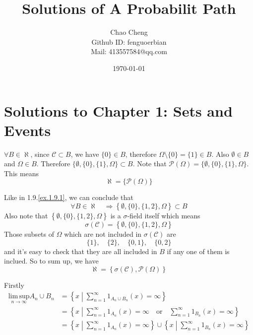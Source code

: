 \documentclass[a4paper,12pt]{article}
\title{Solutions of A Probabilit Path}
\author{Chao Cheng
  \\
  Github ID: fenguoerbian
  \\
  Mail: 413557584@qq.com}
\date{\today}
\begin{document}
\maketitle

\section{Solutions to Chapter 1: Sets and Events}
\label{sec:solutions-chapter-1}

\setcounter{Lcount}{0}
\begin{list}{1.9.}{}
\item \label{ex.1.9.1}
  $\forall B \in \aleph$, since $\mathcal{C}\subset B$, we have $\{0\}\in B$, therefore $\Omega\setminus \{0\}=\{1\}\in B$. Also $\emptyset\in B$ and $\Omega\in B$. Therefore $\{\emptyset,\{0\}, \{1\}, \Omega\}\subset B$. Note that $\mathcal{P}\left(\Omega\right) = \{\emptyset,\{0\}, \{1\}, \Omega\}$. This means
  \[
    \aleph = \{\mathcal{P}\left(\Omega\right)\}
  \]
\item \label{ex.1.9.2}Like in 1.9.\ref{ex.1.9.1}, we can conclude that
  \[
    \forall B \in \aleph \quad \Rightarrow \left\{\emptyset, \{0\}, \{1,2\}, \Omega\right\} \subset B
  \]
  Also note that $\left\{\emptyset, \{0\}, \{1,2\}, \Omega\right\}$ is a $\sigma$-field itself which means
  \[
    \sigma\left(\mathcal{C}\right) = \left\{\emptyset, \{0\}, \{1,2\}, \Omega\right\}
  \]
  Those subsets of $\Omega$ which are not included in $\sigma(\mathcal{C})$ are
  \[
    \{1\},\quad \{2\},\quad \{0,1\},\quad \{0,2\}
  \]
  and it's easy to check that they are all included in $B$ if any one of them is inclued. So to sum up, we have
  \[
    \aleph = \left\{\sigma(\mathcal{C}), \mathcal{P}\left(\Omega\right)\right\}
  \]
\item \label{ex.1.9.3} Firstly
  \[
    \begin{aligned}
      \underset{n\to\infty}{\mathrm{lim\,sup}} A_n\cup B_n
      &= \left\{x\middle| \sum\limits_{n=1}^\infty 1_{A_n\cup B_n}\left(x\right)=\infty\right\}    \\
      &= \left\{x\middle| \sum\limits_{n=1}^\infty 1_{A_n}\left(x\right)=\infty\quad \mathrm{or}\quad
         \sum\limits_{n=1}^\infty 1_{B_n}\left(x\right)=\infty\right\}    \\
      &= \left\{x\middle| \sum\limits_{n=1}^\infty 1_{A_n}\left(x\right)=\infty \right\} \cup
         \left\{x\middle| \sum\limits_{n=1}^\infty 1_{B_n}\left(x\right)=\infty\right\}    \\

\end{aligned}\]
\end{list}
\end{document}
